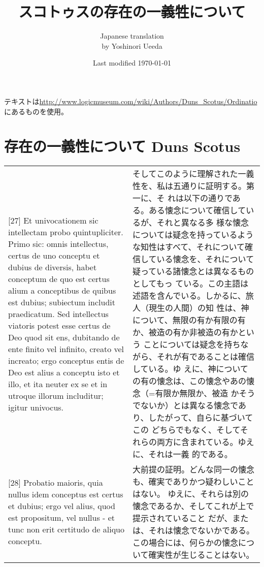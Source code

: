 \documentclass[paper=a4paper,fontsize=10pt,jafontsize=9pt,titlepage]{jlreq}
\title{スコトゥスの存在の一義牲について}
\author{Japanese translation\\by Yoshinori {Ueeda}}
\date{Last modified \today}
\begin{document}
\maketitle

\newpage

\noindent
テキストは\url{http://www.logicmuseum.com/wiki/Authors/Duns_Scotus/Ordinatio}にあるものを使用。

\section*{存在の一義性について Duns Scotus}
\begin{longtable}{p{21em}p{21em}}
 [27] Et univocationem sic intellectam probo quintupliciter. Primo
 sic: omnis intellectus, certus de uno conceptu et dubius de diversis,
 habet conceptum de quo est certus alium a conceptibus de quibus est
 dubius; subiectum includit praedicatum. Sed intellectus viatoris
 potest esse certus de Deo quod sit ens, dubitando de ente finito vel
 infinito, creato vel increato; ergo conceptus entis de Deo est alius
 a conceptu isto et illo, et ita neuter ex se et in utroque illorum
 includitur; igitur univocus.

 &

 そしてこのように理解された一義性を、私は五通りに証明する。第一に、そ
 れは以下の通りである。ある懐念について確信しているが、それと異なる多
 様な懐念については疑念を持っているような知性はすべて、それについて確
 信している懐念を、それについて疑っている諸懐念とは異なるものとしてもっ
 ている。この主語は述語を含んでいる。しかるに、旅人（現生の人間）の知
 性は、神について、無限の有か有限の有か、被造の有か非被造の有かという
 ことについては疑念を持ちながら、それが有であることは確信している。ゆ
 えに、神についての有の懐念は、この懐念やあの懐念（=有限か無限か、被造
 かそうでないか）とは異なる懐念であり、したがって、自らに基づいてこの
 どちらでもなく、そしてそれらの両方に含まれている。ゆえに、それは一義
 的である。

 \\

 [28] Probatio maioris, quia nullus idem conceptus est certus et
 dubius; ergo vel alius, quod est propositum, vel nullus - et tunc non
 erit certitudo de aliquo conceptu.

 &

 大前提の証明。どんな同一の懐念も、確実でありかつ疑わしいことはない。
 ゆえに、それらは別の懐念であるか、そしてこれが上で提示されていること
 だが、または、それは懐念でないかである。この場合には、何らかの懐念につ
 いて確実性が生じることはない。
 

\end{longtable}
\end{document}
